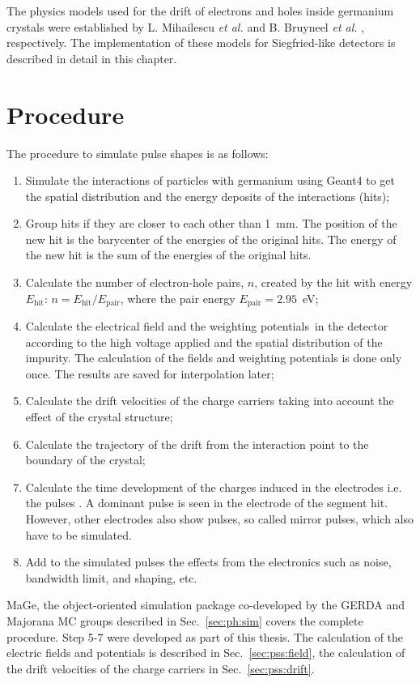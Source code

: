 The physics models used for the drift of electrons and holes inside
germanium crystals were established by L. Mihailescu \textit{et
al.}\cite{miha} and B. Bruyneel \emph{et al.} \cite{bart},
respectively. The implementation of these models for Siegfried-like
detectors is described in detail in this chapter.


\section{Procedure}
\label{sec:pss:proc}
The procedure to simulate pulse shapes \cite{agata} is as follows:
\begin{enumerate} 
\item Simulate the interactions of particles with germanium using
Geant4 to get the spatial distribution and the energy deposits of the
interactions (hits);
\item Group hits if they are closer to each other than 1~mm. The
position of the new hit is the barycenter of the energies of the
original hits. The energy of the new hit is the sum of the energies of
the original hits.
\item Calculate the number of electron-hole pairs, $n$, created by the
hit with energy $E_{\text{hit}}$: $n = E_{\text{hit}} /
E_{\text{pair}}$, where the pair energy $E_{\text{pair}} = 2.95$~eV;
\item Calculate the electrical field and the weighting
potentials\,\cite{Gat82, Rad88, He00} in the detector according to the
high voltage applied and the spatial distribution of the impurity. The
calculation of the fields and weighting potentials is done only
once. The results are saved for interpolation later;
\item Calculate the drift velocities of the charge carriers taking
into account the effect of the crystal structure;
\item Calculate the trajectory of the drift from the interaction point
to the boundary of the crystal;
\item Calculate the time development of the charges induced in the
electrodes i.e. the pulses \cite{igex}. A dominant pulse is seen in
the electrode of the segment hit. However, other electrodes also show
pulses, so called mirror pulses, which also have to be simulated.
\item Add to the simulated pulses the effects from the electronics
such as noise, bandwidth limit, and shaping, etc.
\end{enumerate} 
MaGe, the object-oriented simulation package co-developed by the GERDA
and Majorana MC groups described in Sec.~\ref{sec:ph:sim} covers the
complete procedure. Step 5-7 were developed as part of this
thesis. The calculation of the electric fields and potentials is
described in Sec.~\ref{sec:pss:field}, the calculation of the drift
velocities of the charge carriers in Sec.~\ref{sec:pss:drift}.
 

